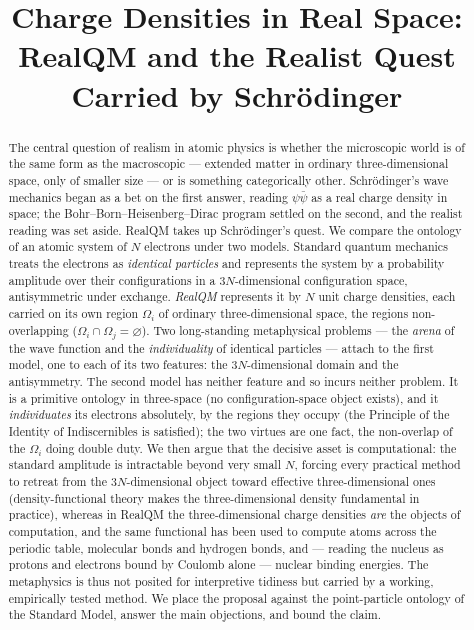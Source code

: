 \documentclass[11pt]{article}
\title{Charge Densities in Real Space:\\
RealQM and the Realist Quest Carried by Schr\"odinger}
\author{}
\date{}
\begin{document}
\maketitle

\begin{abstract}
The central question of realism in atomic physics is whether the microscopic world is of the same form as
the macroscopic --- extended matter in ordinary three-dimensional space, only of smaller size --- or is
something categorically other. Schr\"odinger's wave mechanics began as a bet on the first answer, reading
$\psi\bar\psi$ as a real charge density in space; the Bohr--Born--Heisenberg--Dirac program settled on the
second, and the realist reading was set aside. RealQM takes up Schr\"odinger's quest. We compare the
ontology of an atomic system of $N$ electrons under two models. Standard quantum
mechanics treats the electrons as \emph{identical particles} and represents the system by a probability
amplitude over their configurations in a $3N$-dimensional configuration space, antisymmetric under
exchange. \emph{RealQM} represents it by $N$ unit charge densities, each carried on its own region
$\Omega_i$ of ordinary three-dimensional space, the regions non-overlapping
($\Omega_i\cap\Omega_j=\varnothing$). Two long-standing metaphysical problems --- the \emph{arena} of the
wave function and the \emph{individuality} of identical particles --- attach to the first model, one to
each of its two features: the $3N$-dimensional domain and the antisymmetry. The second model has neither
feature and so incurs neither problem. It is a primitive ontology in three-space (no configuration-space
object exists), and it \emph{individuates} its electrons absolutely, by the regions they occupy (the
Principle of the Identity of Indiscernibles is satisfied); the two virtues are one fact, the non-overlap of
the $\Omega_i$ doing double duty. We then argue that the decisive asset is computational: the standard
amplitude is intractable beyond very small $N$, forcing every practical method to retreat from the
$3N$-dimensional object toward effective three-dimensional ones (density-functional theory makes the
three-dimensional density fundamental in practice), whereas in RealQM the three-dimensional charge
densities \emph{are} the objects of computation, and the same functional has been used to compute atoms
across the periodic table, molecular bonds and hydrogen bonds, and --- reading the nucleus as protons and
electrons bound by Coulomb alone --- nuclear binding energies. The metaphysics is thus not posited for
interpretive tidiness but carried by a working, empirically tested method. We place the proposal against
the point-particle ontology of the Standard Model, answer the main objections, and bound the claim.
\end{abstract}
\end{document}
